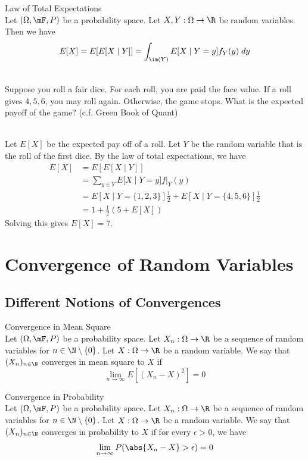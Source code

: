 \documentclass[a4paper]{article}
\begin{document}
\begin{thm}{Law of Total Expectations}{}\\
Let $(\Omega,\mF,P)$ be a probability space. Let $X,Y:\Omega\to\R$ be random variables. Then we have $$E[X]=E[E[X\;|\;Y]]=\int_{\im(Y)}E[X\;|\;Y=y]f_Y(y)\;dy$$
\end{thm}

\begin{eg}{}{}\\
Suppose you roll a fair dice. For each roll, you are paid the face value. If a roll gives $4,5,6$, you may roll again. Otherwise, the game stops. What is the expected payoff of the game? (c.f. Green Book of Quant)
\begin{answer}\\
Let $E[X]$ be the expected pay off of a roll. Let $Y$ be the random variable that is the roll of the first dice. By the law of total expectations, we have
\begin{align*}
E[X]&=E[E[X\;|\;Y]]\\
&=\sum_{y\in Y}E[X\;|\;Y=y]f|_Y(y)\\
&=E[X\;|\;Y=\{1,2,3\}]\frac{1}{2}+E[X\;|\;Y=\{4,5,6\}]\frac{1}{2}\\
&=1+\frac{1}{2}(5+E[X])
\end{align*}
Solving this gives $E[X]=7$. 
\end{answer}
\end{eg}

\pagebreak
\section{Convergence of Random Variables}
\subsection{Different Notions of Convergences}
\begin{defn}{Convergence in Mean Square}{}\\
Let $(\Omega,\mF,P)$ be a probability space. Let $X_n:\Omega\to\R$ be a sequence of random variables for $n\in\N\setminus\{0\}$. Let $X:\Omega\to\R$ be a random variable. We say that $(X_n)_{n\in\N}$ converges in mean square to $X$ if $$\lim_{n\to\infty}E[(X_n-X)^2]=0$$
\end{defn}

\begin{defn}{Convergence in Probability}{}\\
Let $(\Omega,\mF,P)$ be a probability space. Let $X_n:\Omega\to\R$ be a sequence of random variables for $n\in\N\setminus\{0\}$. Let $X:\Omega\to\R$ be a random variable. We say that $(X_n)_{n\in\N}$ converges in probability to $X$ if for every $\epsilon>0$, we have $$\lim_{n\to\infty}P(\abs{X_n-X}>\epsilon)=0$$
\end{defn}
\end{document}
